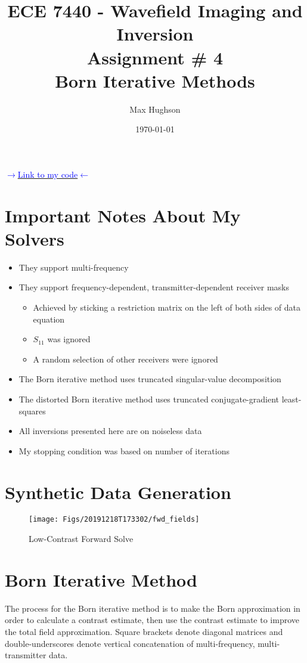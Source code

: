 \documentclass[final,titlepage,onecolumn]{article}
\title{ECE 7440 - Wavefield Imaging and Inversion\\
Assignment \# 4\\
Born Iterative Methods}
\author{Max Hughson}
\date{\today}
\begin{document}
\maketitle

\begin{center}
\Large{\href{https://github.com/hughsonm/WFI/tree/master/Assignments/A4}{\textcolor{blue}{$ \rightarrow $Link to my code$ \leftarrow $}}}	
\end{center}

\normalsize

\FloatBarrier
\section{Important Notes About My Solvers}
\begin{itemize}
	\item They support multi-frequency
	\item They support frequency-dependent, transmitter-dependent receiver masks
	\begin{itemize}
		\item Achieved by sticking a restriction matrix on the left of both sides of data equation
		\item $ S_{11} $ was ignored
		\item A random selection of other receivers were ignored
	\end{itemize}
	\item The Born iterative method uses truncated singular-value decomposition
	\item The distorted Born iterative method uses truncated conjugate-gradient least-squares
	\item All inversions presented here are on noiseless data
	\item My stopping condition was based on number of iterations
\end{itemize}

\FloatBarrier
\section{Synthetic Data Generation}
\begin{figure}[h]
	\centering
	\texttt{[image: Figs/20191218T173302/fwd\_fields]}
	\caption[fwd_fields]{Low-Contrast Forward Solve}
	\label{fig:fwdfields}
\end{figure}



\FloatBarrier
\section{Born Iterative Method}
The process for the Born iterative method is to make the Born approximation in order to calculate a contrast estimate, then use the contrast estimate to improve the total field approximation. Square brackets denote diagonal matrices and double-underscores denote vertical concatenation of multi-frequency, multi-transmitter data.
\end{document}
